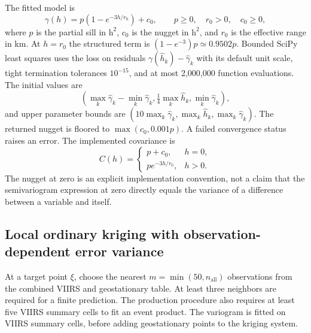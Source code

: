 \documentclass[11pt,a4paper]{article}
\begin{document}
The fitted model is
\begin{equation}
\gamma(h)=p\left(1-e^{-3h/r_0}\right)+c_0,
\qquad p\ge0,\quad r_0>0,\quad c_0\ge0,
\label{eq:variogram}
\end{equation}
where $p$ is the partial sill in $\mathrm{h^2}$, $c_0$ is the nugget in
$\mathrm{h^2}$, and $r_0$ is the effective range in km. At $h=r_0$ the
structured term is $(1-e^{-3})p\simeq0.9502p$. Bounded SciPy least squares
uses the  loss on residuals
$\gamma(\widehat h_k)-\widehat\gamma_k$ with its default unit scale, tight
termination tolerances $10^{-15}$, and at most 2,000,000 function evaluations.
The initial values are
\begin{equation}
\left(\max_k\widehat\gamma_k-\min_k\widehat\gamma_k,
       \tfrac14\max_k\widehat h_k,
       \min_k\widehat\gamma_k\right),
\end{equation}
and upper parameter bounds are
$(10\max_k\widehat\gamma_k,\max_k\widehat h_k,
\max_k\widehat\gamma_k)$. The returned nugget is floored to
$\max(c_0,0.001p)$. A failed convergence status raises an error.
The implemented covariance is
\begin{equation}
C(h)=\begin{cases}p+c_0,&h=0,\\p e^{-3h/r_0},&h>0.\end{cases}
\end{equation}
The nugget at zero is an explicit implementation convention, not a claim that
the semivariogram expression at zero directly equals the variance of a
difference between a variable and itself.

\subsection{Local ordinary kriging with observation-dependent error variance}
At a target point $\xi$, choose the nearest $m=\min(50,n_{\mathrm{all}})$
observations from the combined VIIRS and geostationary table. At least three
neighbors are required for a finite prediction. The production procedure also
requires at least five VIIRS summary cells to fit an event product.
The variogram is fitted on VIIRS summary cells, before adding geostationary
points to the kriging system.
\end{document}
